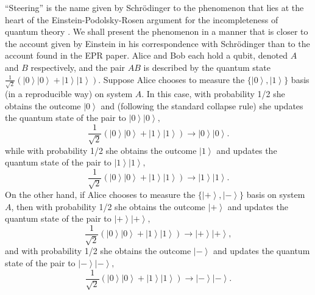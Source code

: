 \documentclass[pra,twocolumn,nofootinbib,showpacs]{revtex4}
\begin{document}
``Steering'' is the name given by Schr\"{o}dinger to the phenomenon that
lies at the heart of the Einstein-Podolsky-Rosen argument for the
incompleteness of quantum theory \cite{EPR}. We shall present the phenomenon
in a manner that is closer to the account given by Einstein in his
correspondence with Schr\"{o}dinger \cite{Einsteinletters} than to the
account found in the EPR paper. Alice and Bob each hold a qubit, denoted $A$
and $B$ respectively, and the pair $AB$ is described by the quantum state $%
\frac{1}{\sqrt{2}}\left( \left| 0\right\rangle \left| 0\right\rangle +\left|
1\right\rangle \left| 1\right\rangle \right) .$ Suppose Alice chooses to
measure the $\{\left| 0\right\rangle ,\left| 1\right\rangle \}$ basis (in a
reproducible way) on system $A.$ In this case, with probability 1/2 she
obtains the outcome $\left| 0\right\rangle $ and (following the standard
collapse rule) she updates the quantum state of the pair to $\left|
0\right\rangle \left| 0\right\rangle ,$%
\begin{equation}
\frac{1}{\sqrt{2}}\left( \left| 0\right\rangle \left| 0\right\rangle +\left|
1\right\rangle \left| 1\right\rangle \right) \rightarrow \left|
0\right\rangle \left| 0\right\rangle .  \label{rsq1}
\end{equation}
while with probability 1/2 she obtains the outcome $\left| 1\right\rangle $
and updates the quantum state of the pair to $\left| 1\right\rangle \left|
1\right\rangle ,$%
\begin{equation}
\frac{1}{\sqrt{2}}\left( \left| 0\right\rangle \left| 0\right\rangle +\left|
1\right\rangle \left| 1\right\rangle \right) \rightarrow \left|
1\right\rangle \left| 1\right\rangle .  \label{rsq2}
\end{equation}
On the other hand, if Alice chooses to measure the $\{\left| +\right\rangle
,\left| -\right\rangle \}$ basis on system $A$, then with probability 1/2
she obtains the outcome $\left| +\right\rangle $ and updates the quantum
state of the pair to $\left| +\right\rangle \left| +\right\rangle ,$%
\begin{equation}
\frac{1}{\sqrt{2}}\left( \left| 0\right\rangle \left| 0\right\rangle +\left|
1\right\rangle \left| 1\right\rangle \right) \rightarrow \left|
+\right\rangle \left| +\right\rangle ,  \label{rsq3}
\end{equation}
and with probability 1/2 she obtains the outcome $\left| -\right\rangle $
and updates the quantum state of the pair to $\left| -\right\rangle \left|
-\right\rangle ,$%
\begin{equation}
\frac{1}{\sqrt{2}}\left( \left| 0\right\rangle \left| 0\right\rangle +\left|
1\right\rangle \left| 1\right\rangle \right) \rightarrow \left|
-\right\rangle \left| -\right\rangle .  \label{rsq4}
\end{equation}
\end{document}
